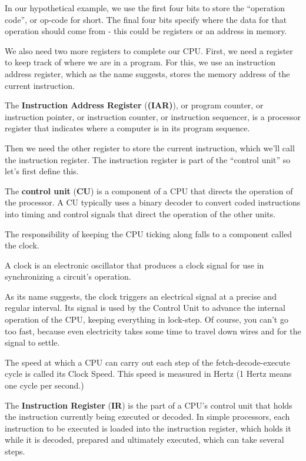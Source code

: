 \be
In our hypothetical example, we use the first four bits to store the ``operation code'', or op-code for short. The
final four bits specify where the data for that operation should come from - this could be registers or an address in
memory.

\ee

We also need two more registers to complete our CPU. First, we need a register to keep track of where we are in a
program. For this, we use an instruction address register, which as the name suggests, stores the memory address of
the current instruction.

The \textbf{Instruction Address Register} (\textbf{(IAR)}), or program counter, or instruction pointer, or
instruction counter, or instruction sequencer, is a processor register that indicates where a computer is in its
program sequence.
\ed

Then we need the other register to store the current instruction, which we'll call the instruction register. The
instruction register is part of the ``control unit'' so let's first define this.

The \textbf{control unit} (\textbf{CU}) is a component of a CPU that directs the operation of the processor. A CU
typically uses a binary decoder to convert coded instructions into timing and control signals that direct the
operation of the other units.
\ed

The responsibility of keeping the CPU ticking along falls to a component called the clock.

\bd[Clock]
A clock is an electronic oscillator that produces a clock signal for use in synchronizing a circuit's operation.
\ed

As its name suggests, the clock triggers an electrical signal at a precise and regular interval. Its signal is used
by the Control Unit to advance the internal operation of the CPU, keeping everything in lock-step. Of course, you
can't go too fast, because even electricity takes some time to travel down wires and for the signal to settle.

The speed at which a CPU can carry out each step of the fetch-decode-execute cycle is called its Clock Speed. This
speed is measured in Hertz (1 Hertz means one cycle per second.)
\ed

The \textbf{Instruction Register} (\textbf{IR}) is the part of a CPU's control unit that holds the instruction
currently being executed or decoded. In simple processors, each instruction to be executed is loaded into the
instruction register, which holds it while it is decoded, prepared and ultimately executed, which can take several
steps.
\ed

